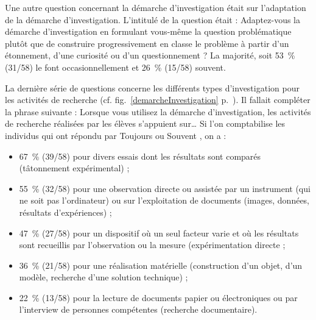 Une autre question concernant la démarche d’investigation était sur l’adaptation de la démarche d’investigation. L’intitulé de la question était : \og Adaptez-vous la démarche d’investigation en formulant vous-même la question problématique plutôt que de construire progressivement en classe le problème à partir d’un étonnement, d’une curiosité ou d’un questionnement ? \fg{} La majorité, soit 53~\% (31/58) le font occasionnellement et 26~\% (15/58) souvent.

La dernière série de questions concerne les différents types d’investigation pour les activités de recherche (cf. fig.~\ref{demarcheInvestigation} p.~\pageref{demarcheInvestigation}). Il fallait compléter la phrase suivante : \og Lorsque vous utilisez la démarche d’investigation, les activités de recherche réalisées par les élèves s’appuient sur\dots{} \fg{} Si l’on comptabilise les individus qui ont répondu par \og Toujours \fg{} ou \og Souvent \fg{}, on a :
\begin{itemize}
\item 67~\% (39/58) pour divers essais dont les résultats sont comparés (tâtonnement expérimental) ;
\item 55~\% (32/58) pour une observation directe ou assistée par un instrument (qui ne soit pas l’ordinateur) ou sur l’exploitation de documents (images, données, résultats d’expériences) ;
\item 47~\% (27/58) pour un dispositif où un seul facteur varie et où les résultats sont recueillis par l’observation ou la mesure (expérimentation directe ;
\item 36~\% (21/58) pour une réalisation matérielle (construction d’un objet, d’un modèle, recherche d’une solution technique) ;
\item 22~\% (13/58) pour la lecture de documents papier ou électroniques ou par l’interview de personnes compétentes (recherche documentaire).
\end{itemize}
